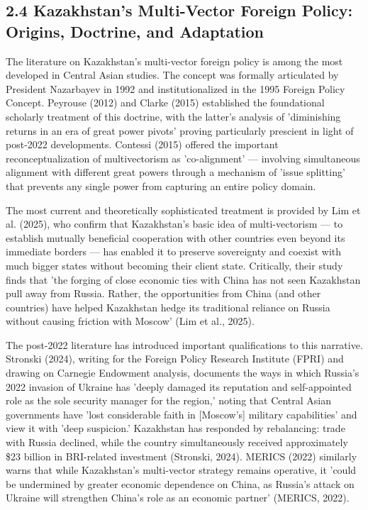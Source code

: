 \documentclass[12pt]{article}
\begin{document}
\subsection{2.4 Kazakhstan's Multi-Vector Foreign Policy: Origins, Doctrine, and Adaptation}
The literature on Kazakhstan's multi-vector foreign policy is among the most developed in Central Asian studies. The concept was formally articulated by President Nazarbayev in 1992 and institutionalized in the 1995 Foreign Policy Concept. Peyrouse (2012) and Clarke (2015) established the foundational scholarly treatment of this doctrine, with the latter's analysis of 'diminishing returns in an era of great power pivots' proving particularly prescient in light of post-2022 developments. Contessi (2015) offered the important reconceptualization of multivectorism as 'co-alignment' --- involving simultaneous alignment with different great powers through a mechanism of 'issue splitting' that prevents any single power from capturing an entire policy domain.\par
The most current and theoretically sophisticated treatment is provided by Lim et al. (2025), who confirm that Kazakhstan's basic idea of multi-vectorism --- to establish mutually beneficial cooperation with other countries even beyond its immediate borders --- has enabled it to preserve sovereignty and coexist with much bigger states without becoming their client state. Critically, their study finds that 'the forging of close economic ties with China has not seen Kazakhstan pull away from Russia. Rather, the opportunities from China (and other countries) have helped Kazakhstan hedge its traditional reliance on Russia without causing friction with Moscow' (Lim et al., 2025).\par
The post-2022 literature has introduced important qualifications to this narrative. Stronski (2024), writing for the Foreign Policy Research Institute (FPRI) and drawing on Carnegie Endowment analysis, documents the ways in which Russia's 2022 invasion of Ukraine has 'deeply damaged its reputation and self-appointed role as the sole security manager for the region,' noting that Central Asian governments have 'lost considerable faith in [Moscow's] military capabilities' and view it with 'deep suspicion.' Kazakhstan has responded by rebalancing: trade with Russia declined, while the country simultaneously received approximately \$23 billion in BRI-related investment (Stronski, 2024). MERICS (2022) similarly warns that while Kazakhstan's multi-vector strategy remains operative, it 'could be undermined by greater economic dependence on China, as Russia's attack on Ukraine will strengthen China's role as an economic partner' (MERICS, 2022).\par
\end{document}

